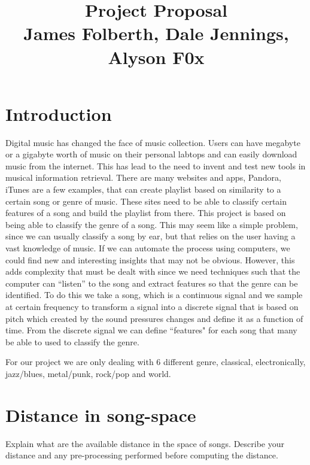 \documentclass[12pt]{article}
\begin{document}
                                       
\title{Project Proposal\\
James Folberth, Dale Jennings, Alyson F0x}
\maketitle
\section{Introduction}
\indent Digital music has changed the face of music collection. Users can have megabyte or a gigabyte worth of music on their personal labtops and can easily download music from the internet. This has lead to the need to invent and test new tools in musical information retrieval. There are many websites and apps, Pandora, iTunes are a few examples, that can create playlist based on similarity to a certain song or genre of music. These sites need to be able to classify certain features of a song and build the playlist from there. This project is based on being able to classify the genre of a song. This may seem like a simple problem, since we can usually classify a song by ear, but that relies on the user having a vast knowledge of music. If we can automate the process using computers, we could find new and interesting insights that may not be obvious. However, this adds complexity that must be dealt with since we need techniques such that  the computer can ``listen'' to the song and extract features so that the genre can be identified. To do this we take  a song, which is a continuous signal and we sample at certain frequency to transform a signal into a discrete signal that is based on pitch which created by the sound pressures changes  and define it as a function of time. From the discrete signal we can define  ``features" for each song that many be able to used to classify the genre. 

\indent For our project we are only dealing with 6 different genre, classical, electronically, jazz/blues, metal/punk, rock/pop and world. 
\indent
\section{Distance in song-space}
Explain what are the available distance in the space of songs.
Describe your distance and any pre-processing performed before
computing the distance.
\end{document}
